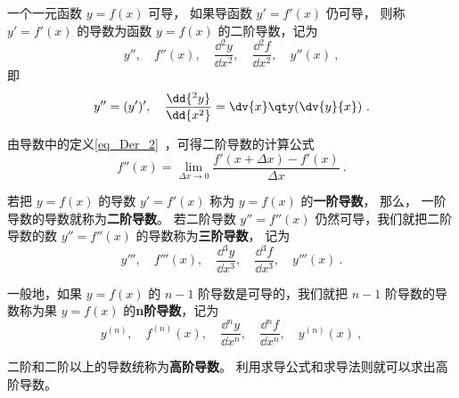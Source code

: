 
\begin{issues}
\end{issues}


一个一元函数 $y=f(x)$ 可导， 如果导函数 $y'=f'(x)$ 仍可导， 则称 $y'=f'(x)$ 的导数为函数 $y=f(x)$ 的二阶导数，记为
\begin{equation}
y'',\quad f''(x),\quad \frac{\dd{^2y}}{\dd{x^2}},\quad \frac{\dd{^2f}}{\dd{x^2}},\quad y''(x)~,
\end{equation}
即
\begin{equation}
y''=(y')',\quad\frac{\dd{^2y}}{\dd{x^2}}=\dv{x}\qty(\dv{y}{x})~.
\end{equation}

由导数中的定义\autoref{eq_Der_2}~，可得二阶导数的计算公式
\begin{equation}
f''(x)=\lim_{\Delta x \to 0} \frac{f'(x+ \Delta x)-f'(x)}{\Delta x}~.
\end{equation}

若把 $y=f(x)$ 的导数 $y'=f'(x)$ 称为 $y=f(x)$ 的\textbf{一阶导数}， 那么， 一阶导数的导数就称为\textbf{二阶导数}。 若二阶导数 $y''=f''(x)$ 仍然可导，我们就把二阶导数的数 $y''=f''(x)$ 的导数称为\textbf{三阶导数}， 记为
\begin{equation}
y''',\quad f'''(x),\quad \frac{\dd{^3y}}{\dd{x^3}},\quad \frac{\dd{^3f}}{\dd{x^3}},\quad y'''(x)~.
\end{equation}

一般地，如果 $y=f(x)$ 的 $n-1$ 阶导数是可导的，我们就把 $n-1$ 阶导数的导数称为果 $y=f(x)$ 的\textbf{n阶导数}，记为
\begin{equation}
y^{(n)},\quad f^{(n)}(x),\quad \frac{\dd{^ny}}{\dd{x^n}},\quad \frac{\dd{^nf}}{\dd{x^n}},\quad y^{(n)}(x)~,
\end{equation}

二阶和二阶以上的导数统称为\textbf{高阶导数}。 利用求导公式和求导法则就可以求出高阶导数。

